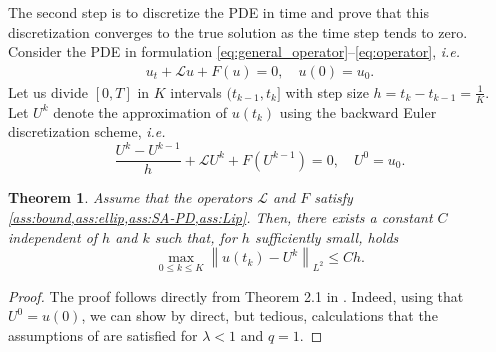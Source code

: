 \documentclass[11pt,a4paper,reqno]{amsart}
\numberwithin{equation}{section}
\theoremstyle{plain}
\newtheorem{theorem}{Theorem}[section]
\theoremstyle{definition}
\newcommand{\norm}[1]{\left\|#1 \right\|} %
\begin{document}
The second step is to discretize the PDE in time and prove that this discretization converges to the true solution as the time step tends to zero.
Consider the PDE in formulation \eqref{eq:general_operator}--\eqref{eq:operator}, \textit{\emph{i.e.}}
\[
\begin{aligned}
u_t + \mathcal{L} u + F (u) = 0, \quad u(0) = u_0.
\end{aligned}
\]
Let us divide $[0,T]$ in $K$ intervals $(t_{k - 1}, t_k]$ with step size $h = t_k - t_{k - 1} = \frac{1}{K}$. 
Let $U^k$ denote the approximation of $u (t_k)$ using the backward Euler discretization scheme, \emph{i.e.}
\begin{equation}
\label{eq:discretization}
\frac{U^k - U^{k - 1}}{h} + \mathcal{L} U^k + F \left( U^{k - 1} \right) = 0, \quad U^0 = u_0.
\end{equation}

\begin{theorem}
\label{thm:time-stepping}
Assume that the operators $\mathcal{L}$ and $F$ satisfy \cref{ass:bound,ass:ellip,ass:SA-PD,ass:Lip}.
Then, there exists a constant $C$ independent of $h$ and $k$ such that, for $h$ sufficiently small, holds
\[
 \max_{0 \leq k \leq K} \norm{u(t_k) - U^k}_{L^2} \leq C h.
\]
\end{theorem}

\begin{proof}
The proof follows directly from Theorem 2.1 in \citet{Akrivis_Crouzeix_Makridakis_1999}.
Indeed, using that $U^0 = u \left( 0 \right)$, we can show by direct, but tedious, calculations that the assumptions of \cite[p.~523]{Akrivis_Crouzeix_Makridakis_1999} are satisfied for $\lambda<1$ and $q=1$.
\end{proof}

 
\end{document}
